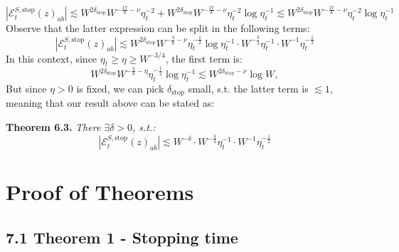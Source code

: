 \documentclass[11pt]{article}
\newenvironment{boxtheorem}[1]
  {\begin{mdframed}\noindent\textbf{#1}\itshape\space}
  {\end{mdframed}}
\newcommand{\E}{\mathcal{E}}
\newcommand{\sto}{\text{stop}}
\begin{document}
\begin{equation*}
|\E_t^{S, \sto}(z)_{ab}|\lesssim W^{2\delta_\sto} W^{-\frac{17}{8}-\nu} \eta_t^{-2}+W^{2\delta_\sto}W^{-\frac{17}{8}-\nu}\eta_t^{-2}\log \eta_t^{-1} \lesssim W^{2\delta_\sto}W^{-\frac{17}{8}-\nu}\eta_t^{-2}\log \eta_t^{-1}
\end{equation*}
Observe that the latter expression can be split in the following terms: $$|\E_t^{S, \sto}(z)_{ab}|\lesssim W^{2\delta_\sto} W^{-\frac{3}{8}-\nu} \eta_t^{-\frac{1}{2}}\log \eta_t^{-1}\cdot W^{-\frac{3}{4}}\eta_t^{-1}\cdot W^{-1}\eta_t^{-\frac{1}{2}}$$
In this context, since $\eta_t \geq \eta\geq W^{-3/4}$, the first term is: $$W^{2\delta_\sto} W^{-\frac{3}{8}-\eta}\eta_t^{-\frac{1}{2}}\log \eta_t^{-1}\lesssim W^{2\delta_\sto-\nu}\log W,$$
But since $\eta>0$ is fixed, we can pick $\delta_\sto$ small, s.t. the latter term is $\lesssim 1$, meaning that our result above can be stated as: 
\begin{boxtheorem}{Theorem 6.3. }There $\exists \delta>0$, s.t.:
$$|\E_t^{S, \sto}(z)_{ab}|\lesssim W^{-\delta}\cdot W^{-\frac{3}{4}}\eta_t^{-1}\cdot W^{-1}\eta_t^{-\frac{1}{2}}$$
\end{boxtheorem}

\newpage

\section{Proof of Theorems}

\subsection*{7.1 Theorem 1 - Stopping time}
\label{proof-stop}
\end{document}
